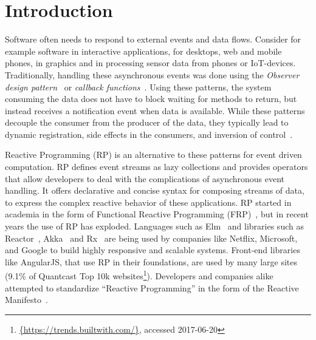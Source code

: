 \section{Introduction}

Software often needs to respond to external events and data flows. Consider for example software in interactive applications, for desktops, web and mobile phones, in graphics and in processing sensor data from phones or IoT-devices. Traditionally, handling these asynchronous events was done using the \emph{Observer design pattern}~\cite{johnson1995design} or \emph{callback functions}~\cite{gallaba2015don}. 
Using these patterns, the system consuming the data does not have to block waiting for methods to return, but instead receives a notification event when data is available. While these patterns decouple the consumer from the producer of the data, they typically lead to dynamic registration, side effects in the consumers, and inversion of control~\cite{salvaneschi2014empirical,edwards2009coherent}.

Reactive Programming (RP) is an alternative to these patterns for event driven computation. 
RP defines event streams as lazy collections and provides operators that allow developers to deal with the complications of asynchronous event handling.
It offers declarative and concise syntax for composing streams of data, to express the complex reactive behavior of these applications.
RP started in academia in the form of Functional Reactive Programming (FRP)~\cite{elliott1997functional,elliott2009push,czaplicki2013asynchronous,maier2010deprecating,meyerovich2009flapjax}, but in recent years the use of RP has exploded. Languages such as Elm~\cite{czaplicki2012elm} and libraries such as Reactor~\cite{Gutierrez2017}, Akka~\cite{klangakka} and Rx~\cite{meijer2010subject} are being used by companies like Netflix, Microsoft, and Google to build highly responsive and scalable systems. Front-end libraries like AngularJS, that use RP in their foundations, are used by many large sites (9.1\% 
of Quantcast Top 10k 
websites\footnote{\url{{https://trends.builtwith.com/}}, accessed 2017-06-20}). 
Developers and companies alike attempted to standardize ``Reactive Programming'' in the form of the Reactive Manifesto~\cite{boner2014reactive}.

